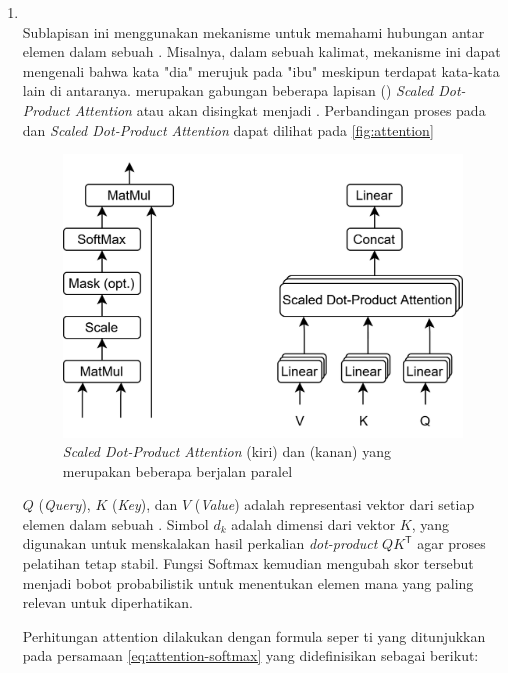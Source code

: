 \begin{enumerate}
	\item \mha~\\
	      Sublapisan ini menggunakan mekanisme \selfattention{} untuk memahami hubungan antar elemen dalam sebuah \sequence{}. Misalnya, dalam sebuah kalimat, mekanisme ini dapat mengenali bahwa kata "dia"
	      merujuk pada "ibu" meskipun terdapat kata-kata lain di antaranya.
	      \mha{} merupakan gabungan beberapa lapisan (\layer)
	      \emph{Scaled Dot-Product Attention} atau akan disingkat menjadi \attention. Perbandingan proses pada \mha{} dan \emph{Scaled Dot-Product Attention} dapat dilihat pada \autoref{fig:attention}

	      \begin{figure}[htbp]
		      \centering
		      \includegraphics[width=.8\textwidth]{images/attentionmha.png}
		      \caption{\emph{Scaled Dot-Product Attention} (kiri) dan \mha{} (kanan) yang merupakan beberapa \layer{} \attention{} berjalan paralel \parencite{vaswani2017attention}}
		      \label{fig:attention}
	      \end{figure}

	      $Q$ (\emph{Query}), $K$ (\emph{Key}), dan $V$ (\emph{Value}) adalah representasi vektor dari setiap elemen dalam sebuah \sequence. Simbol $d_k$ adalah dimensi dari vektor $K$, yang digunakan untuk menskalakan hasil perkalian \emph{dot-product} $QK^\mathsf{T}$ agar proses pelatihan tetap stabil. Fungsi Softmax kemudian mengubah skor tersebut menjadi bobot probabilistik untuk menentukan elemen mana yang paling relevan untuk diperhatikan.

	      \pagebreak

	      Perhitungan attention dilakukan dengan formula seper	ti yang ditunjukkan pada persamaan \eqref{eq:attention-softmax} \parencite{vaswani2017attention} yang didefinisikan sebagai berikut:


\end{enumerate}
